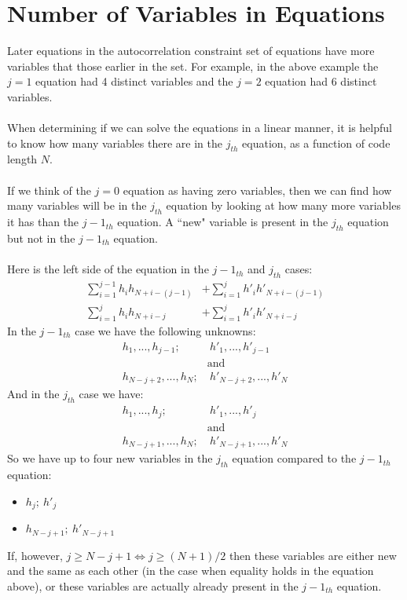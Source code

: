 \documentclass[a4paper]{article}
\begin{document}
\section*{Number of Variables in Equations}
Later equations in the autocorrelation constraint set of equations have more variables that those earlier in the set. For example, in the above example the $j=1$ equation had 4 distinct variables and the $j=2$ equation had 6 distinct variables.
\\\\
When determining if we can solve the equations in a linear manner, it is helpful to know how many variables there are in the $j_{th}$ equation, as a function of code length $N$.
\\\\
If we think of the $j=0$ equation as having zero variables, then we can find how many variables will be in the $j_{th}$ equation by looking at how many more variables it has than the $j-1_{th}$ equation.  A ``new" variable is present in the $j_{th}$ equation but not in the $j-1_{th}$ equation.
\\\\
Here is the left side of the equation in the $j-1_{th}$ and $j_{th}$ cases:
\begin{align*}
\sum_{i=1}^{j-1}{h_i h_{N+i-(j-1)}} &+ \sum_{i=1}^j{h'_i h'_{N+i-(j-1)}}\\
\sum_{i=1}^j{h_i h_{N+i-j}} &+ \sum_{i=1}^j{h'_i h'_{N+i-j}}
\end{align*}
In the $j-1_{th}$ case we have the following unknowns:
\begin{align*}
h_1,...,h_{j-1};&~h'_1,...,h'_{j-1}\\
&\text{and}\\
h_{N-j+2},...,h_{N};&~h'_{N-j+2},...,h'_{N}
\end{align*}
And in the $j_{th}$ case we have:
\begin{align*}
h_1,...,h_{j};&~h'_1,...,h'_{j}\\
&\text{and}\\
h_{N-j+1},...,h_{N};&~h'_{N-j+1},...,h'_{N}
\end{align*}
So we have up to four new variables in the $j_{th}$ equation compared to the $j-1_{th}$ equation:
\begin{itemize}
\item $h_j;~h'_j$
\item $h_{N-j+1};~h'_{N-j+1}$
\end{itemize}
If, however, $j \geq N-j+1 \iff j \geq (N+1)/2$ then these variables are either new and the same as each other (in the case when equality holds in the equation above), or these variables are actually already present in the $j-1_{th}$ equation.
\end{document}
